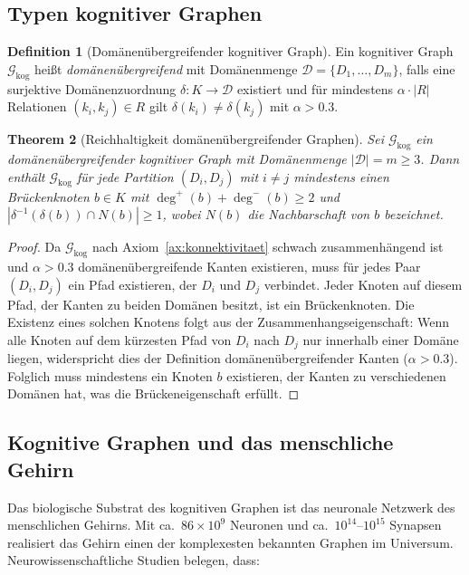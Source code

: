 ﻿\documentclass[12pt,a4paper]{article}
\theoremstyle{plain}
\newtheorem{theorem}{Theorem}[section]
\theoremstyle{definition}
\newtheorem{definition}[theorem]{Definition}
\theoremstyle{remark}
\newcommand{\GG}{\mathcal{G}}
\begin{document}
\subsection{Typen kognitiver Graphen}

\begin{definition}[Domänenübergreifender kognitiver Graph]
\label{def:domainueber}
Ein kognitiver Graph $\GG_{\text{kog}}$ heißt \emph{domänenübergreifend} mit Domänenmenge $\mathcal{D} = \{D_1, \ldots, D_m\}$, falls eine surjektive Domänenzuordnung $\delta: K \to \mathcal{D}$ existiert und für mindestens $\alpha \cdot |R|$ Relationen $(k_i, k_j) \in R$ gilt $\delta(k_i) \neq \delta(k_j)$ mit $\alpha > 0.3$.
\end{definition}

\begin{theorem}[Reichhaltigkeit domänenübergreifender Graphen]
\label{thm:reichhaltigkeit}
Sei $\GG_{\text{kog}}$ ein domänenübergreifender kognitiver Graph mit Domänenmenge $|\mathcal{D}| = m \geq 3$. Dann enthält $\GG_{\text{kog}}$ für jede Partition $(D_i, D_j)$ mit $i \neq j$ mindestens einen \emph{Brückenknoten} $b \in K$ mit $\deg^+(b) + \deg^-(b) \geq 2$ und $|\delta^{-1}(\delta(b)) \cap N(b)| \geq 1$, wobei $N(b)$ die Nachbarschaft von $b$ bezeichnet.
\end{theorem}

\begin{proof}
Da $\GG_{\text{kog}}$ nach Axiom~\ref{ax:konnektivitaet} schwach zusammenhängend ist und $\alpha > 0.3$ domänenübergreifende Kanten existieren, muss für jedes Paar $(D_i, D_j)$ ein Pfad existieren, der $D_i$ und $D_j$ verbindet. Jeder Knoten auf diesem Pfad, der Kanten zu beiden Domänen besitzt, ist ein Brückenknoten. Die Existenz eines solchen Knotens folgt aus der Zusammenhangseigenschaft: Wenn alle Knoten auf dem kürzesten Pfad von $D_i$ nach $D_j$ nur innerhalb einer Domäne liegen, widerspricht dies der Definition domänenübergreifender Kanten ($\alpha > 0.3$). Folglich muss mindestens ein Knoten $b$ existieren, der Kanten zu verschiedenen Domänen hat, was die Brückeneigenschaft erfüllt.
\end{proof}

\subsection{Kognitive Graphen und das menschliche Gehirn}

Das biologische Substrat des kognitiven Graphen ist das neuronale Netzwerk des menschlichen Gehirns. Mit ca.~$86 \times 10^9$ Neuronen und ca.~$10^{14}$--$10^{15}$ Synapsen realisiert das Gehirn einen der komplexesten bekannten Graphen im Universum. Neurowissenschaftliche Studien belegen, dass:
\end{document}
